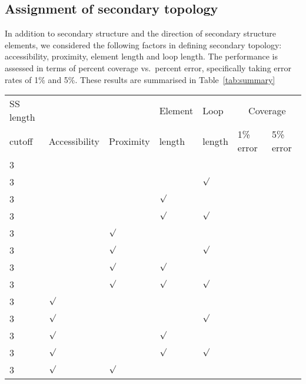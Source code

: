 \documentclass{article}
\newcommand{\tick}{\mbox{$\surd$}}
\begin{document}
\subsection{Assignment of secondary topology}
In addition to secondary structure and the direction of secondary
structure elements, we considered the following factors in defining
secondary topology: accessibility, proximity, element length and loop
length. The performance is assessed in terms of percent coverage vs.\
percent error, specifically taking error rates of 1\% and 5\%. These
results are summarised in Table~\ref{tab:summary}

\begin{table}
\begin{tabular}{|lllll|ll|} \hline
SS length &               &           & Element & Loop   & \multicolumn{2}{c|}{Coverage} \\ \cline{6-7}
cutoff    & Accessibility & Proximity & length  & length & 1\% error & 5\% error \\ \hline
3         &               &           &         &        &           &           \\
3         &               &           &         & \tick  &           &           \\
3         &               &           & \tick   &        &           &           \\
3         &               &           & \tick   & \tick  &           &           \\
3         &               & \tick     &         &        &           &           \\
3         &               & \tick     &         & \tick  &           &           \\
3         &               & \tick     & \tick   &        &           &           \\
3         &               & \tick     & \tick   & \tick  &           &           \\
3         & \tick         &           &         &        &           &           \\
3         & \tick         &           &         & \tick  &           &           \\
3         & \tick         &           & \tick   &        &           &           \\
3         & \tick         &           & \tick   & \tick  &           &           \\
3         & \tick         & \tick     &         &        &           &           \\

\end{tabular}
\end{table}
\end{document}
